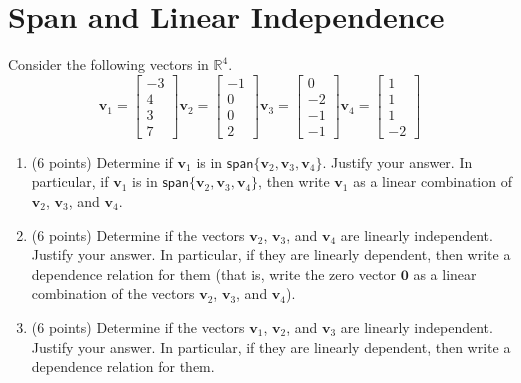 \documentclass{article}
\theoremstyle{remark}
\newcommand{\vv}[1]{\mathbf{#1}}
\newcommand{\vspan}{\mathsf{span}}
\begin{document}
\section{Span and Linear Independence}
Consider the following vectors in $\mathbb R^4$.
\begin{displaymath}
  \mathbf v_1 =
  \begin{bmatrix}
    -3 \\
    4 \\
    3 \\
    7
  \end{bmatrix}
  \mathbf v_2 =
  \begin{bmatrix}
    -1 \\
    0 \\
    0 \\
    2
  \end{bmatrix}
  \mathbf v_3 =
  \begin{bmatrix}
    0 \\
    -2 \\
    -1 \\
    -1
  \end{bmatrix}
  \mathbf v_4 =
  \begin{bmatrix}
    1 \\
    1 \\
    1 \\
    -2
  \end{bmatrix}
\end{displaymath}
\begin{enumerate}
\item (6 points) Determine if $\vv v_1$ is in $\vspan\{\vv v_2, \vv v_3, \vv v_4\}$.
  Justify your answer.
  In particular, if $\vv v_1$ is in $\vspan\{\vv v_2, \vv v_3, \vv v_4\}$, then write $\vv v_1$ as a linear combination of $\vv v_2$, $\vv v_3$, and $\vv v_4$.
\item (6 points) Determine if the vectors $\vv v_2$, $\vv v_3$, and $\vv v_4$ are linearly independent.
  Justify your answer.
  In particular, if they are linearly dependent, then write a dependence relation for them (that is, write the zero vector $\vv 0$ as a linear combination of the vectors $\vv v_2$, $\vv v_3$, and $\vv v_4$).
\item (6 points) Determine if the vectors $\vv v_1$, $\vv v_2$, and $\vv v_3$ are linearly independent.
  Justify your answer.
  In particular, if they are linearly dependent, then write a dependence relation for them.
\end{enumerate}
\end{document}
